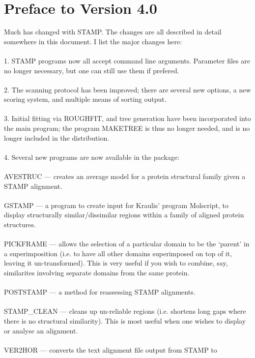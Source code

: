 \section{Preface to Version 4.0}

Much has changed with STAMP.  The changes are all described
in detail somewhere in this document. I list the major changes here:\\
\\
1. STAMP programs now all accept command line arguments.  
Parameter files are no longer necessary, but one can still use 
them if prefered.  \\
\\
2. The scanning protocol has been improved; there
are several new options, a new scoring system, and multiple
means of sorting output.\\
\\
3. Initial fitting via ROUGHFIT, and tree generation have
been incorporated into the main program;  the program MAKETREE is
thus no longer needed, and is no longer included in the 
distribution. \\
\\
4. Several new programs are now available in the package:\\
\\
AVESTRUC  ---  creates an average model for a protein structural
 family given a STAMP alignment.\\
\\
GSTAMP    --- a program to create input for Kraulis' program
 Molscript, to display structurally similar/dissimilar regions
 within a family of aligned protein structures.\\
\\
PICKFRAME --- allows the selection of a particular domain to
 be the `parent' in a superimposition (i.e. to have all other
 domains superimposed on top of it, leaving it un-transformed).  This is
 very useful if you wish to combine, say, similarites involving separate
 domains from the same protein. \\
\\
POSTSTAMP --- a method for reassessing STAMP alignments.\\
\\
STAMP\_CLEAN --- cleans up un-reliable regions (i.e. shortens
 long gaps where there is no structural similarity).  This is
 most useful when one wishes to display or analyse an alignment.\\
\\
VER2HOR --- converts the text alignment file output from STAMP to
